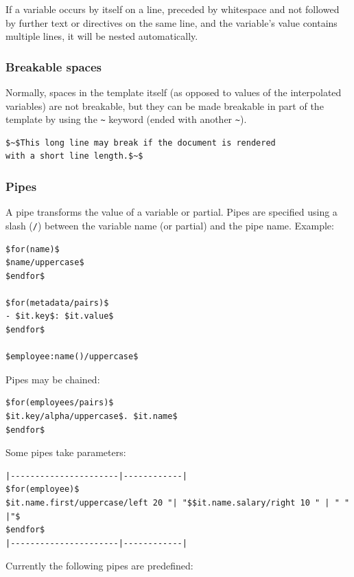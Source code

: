 \documentclass[
]{article}
\begin{document}
If a variable occurs by itself on a line, preceded by whitespace and not
followed by further text or directives on the same line, and the
variable's value contains multiple lines, it will be nested
automatically.

\hypertarget{breakable-spaces}{%
\subsubsection{Breakable spaces}\label{breakable-spaces}}

Normally, spaces in the template itself (as opposed to values of the
interpolated variables) are not breakable, but they can be made
breakable in part of the template by using the
\texttt{\textasciitilde{}} keyword (ended with another
\texttt{\textasciitilde{}}).

\begin{verbatim}
$~$This long line may break if the document is rendered
with a short line length.$~$
\end{verbatim}

\hypertarget{pipes}{%
\subsubsection{Pipes}\label{pipes}}

A pipe transforms the value of a variable or partial. Pipes are
specified using a slash (\texttt{/}) between the variable name (or
partial) and the pipe name. Example:

\begin{verbatim}
$for(name)$
$name/uppercase$
$endfor$

$for(metadata/pairs)$
- $it.key$: $it.value$
$endfor$

$employee:name()/uppercase$
\end{verbatim}

Pipes may be chained:

\begin{verbatim}
$for(employees/pairs)$
$it.key/alpha/uppercase$. $it.name$
$endfor$
\end{verbatim}

Some pipes take parameters:

\begin{verbatim}
|----------------------|------------|
$for(employee)$
$it.name.first/uppercase/left 20 "| "$$it.name.salary/right 10 " | " " |"$
$endfor$
|----------------------|------------|
\end{verbatim}

Currently the following pipes are predefined:
\end{document}
